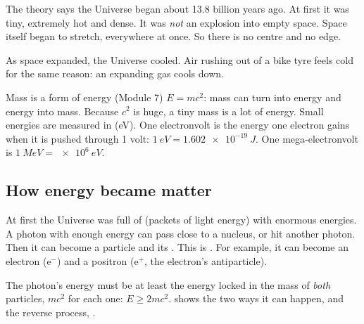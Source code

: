 The  theory says the Universe began about 13.8 billion years ago. At
first it was tiny, extremely hot and dense. It was \emph{not} an explosion into empty
space. Space itself began to stretch, everywhere at once. So there is no centre and no
edge.

As space expanded, the Universe cooled. Air rushing out of a bike tyre feels cold for
the same reason: an expanding gas cools down.

\begin{refresher}{Mass is a form of energy (Module 7)}
$E = mc^2$: mass can turn into energy and energy into mass. Because $c^2$ is huge, a
tiny mass is a lot of energy. Small energies are measured in  (eV).
One electronvolt is the energy one electron gains when it is pushed through 1 volt:
$\qty{1}{eV} = \qty{1.602e-19}{J}$. One mega-electronvolt is $\qty{1}{MeV} = \qty{e6}{eV}$.
\end{refresher}

\subsection{How energy became matter}
At first the Universe was full of  (packets of light energy) with
enormous energies. A photon with enough energy can pass close to a nucleus, or hit
another photon. Then it can become a particle and its . This is
. For example, it can become an electron ($\mathrm{e}^-$) and a
positron ($\mathrm{e}^+$, the electron's antiparticle).

The photon's energy must be at least the energy locked in the mass of \emph{both}
particles, $mc^2$ for each one: $E \geq 2mc^2$.  shows the two ways
it can happen, and the reverse process, .

